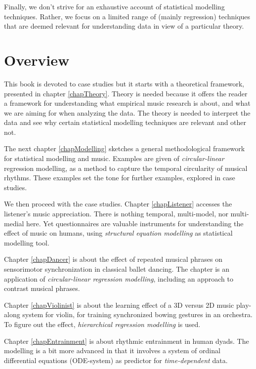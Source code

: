 \documentclass[
]{book}
\theoremstyle{definition}
\theoremstyle{definition}
\theoremstyle{definition}
\theoremstyle{definition}
\theoremstyle{remark}
\begin{document}
Finally, we don't strive for an exhaustive account of statistical modelling techniques. Rather,
we focus on a limited range of (mainly regression) techniques that are deemed relevant for understanding data in view of a particular theory.

\hypertarget{overview}{%
\section{Overview}\label{overview}}

This book is devoted to case studies but it starts with a theoretical framework, presented in chapter \ref{chapTheory}. Theory is needed because it offers the reader a framework for understanding what empirical music research is about, and what we are aiming for when analyzing the data.
The theory is needed to interpret the data and see why certain statistical modelling techniques are relevant and other not.

The next chapter \ref{chapModelling} sketches a general methodological framework for statistical modelling and music. Examples are given of \emph{circular-linear} regression modelling, as a method to capture the temporal circularity of musical rhythms. These examples set the tone for further examples, explored in case studies.

We then proceed with the case studies.
Chapter \ref{chapListener} accesses the listener's music appreciation. There is nothing temporal, multi-model, nor multi-medial here. Yet questionnaires are valuable instruments for understanding the effect of music on humans, using \emph{structural equation modelling} as statistical modelling tool.

Chapter \ref{chapDancer}
is about the effect of repeated musical phrases on sensorimotor synchronization in classical ballet dancing. The chapter is an application of \emph{circular-linear regression modelling}, including an approach to contrast musical phrases.

Chapter \ref{chapViolinist}
is about the learning effect of a 3D versus 2D music play-along system for violin, for training synchronized bowing gestures in an orchestra.
To figure out the effect, \emph{hierarchical regression modelling} is used.

Chapter \ref{chapEntrainment} is about rhythmic entrainment in human dyads. The modelling is a bit more advanced in that it involves a system of ordinal differential equations (ODE-system) as predictor for \emph{time-dependent} data.
\end{document}
